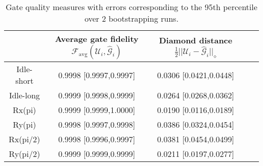 \begin{table}[h!]
\centering
\caption{Gate quality measures with errors corresponding to the                             95th percentile over 2 bootstrapping runs.}
\begin{tabular}{c|c|c|c|c}
\toprule
 & \shortstack{Average gate fidelity \\ $\mathcal{F}_{\mathrm{avg}}(\mathcal{U}_i, \hat{\mathcal{G}}_i)$} & \shortstack{Diamond distance \\ $\frac{1}{2}||\mathcal{U}_i - \hat{\mathcal{G}}_i||_{\diamond}$} \\
\midrule
Idle-short & 0.9998 [0.9997,0.9997] & 0.0306 [0.0421,0.0448] \\
Idle-long & 0.9999 [0.9998,0.9999] & 0.0264 [0.0268,0.0362] \\
Rx(pi) & 0.9999 [0.9999,1.0000] & 0.0190 [0.0116,0.0189] \\
Ry(pi) & 0.9998 [0.9997,0.9998] & 0.0386 [0.0324,0.0454] \\
Rx(pi/2) & 0.9998 [0.9996,0.9997] & 0.0381 [0.0454,0.0499] \\
Ry(pi/2) & 0.9999 [0.9999,0.9999] & 0.0211 [0.0197,0.0277] \\
\bottomrule
\end{tabular}
\end{table}
